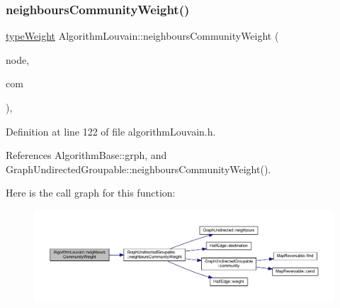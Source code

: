 \subsubsection{\texorpdfstring{neighbours\+Community\+Weight()}{neighboursCommunityWeight()}\hspace{0.1cm}{\footnotesize\ttfamily [1/2]}}
{\footnotesize\ttfamily \hyperlink{edge_8h_a2e7ea3be891ac8b52f749ec73fee6dd2}{type\+Weight} Algorithm\+Louvain\+::neighbours\+Community\+Weight (\begin{DoxyParamCaption}\item[{const \hyperlink{edge_8h_a5fbd20c46956d479cb10afc9855223f6}{type\+Vertex} \&}]{node,  }\item[{const \hyperlink{graphUndirectedGroupable_8h_a914da95c9ea7f14f4b7f875c36818556}{type\+Community} \&}]{com }\end{DoxyParamCaption})\hspace{0.3cm}{\ttfamily [inline]}, {\ttfamily [private]}}



Definition at line 122 of file algorithm\+Louvain.\+h.



References Algorithm\+Base\+::grph, and Graph\+Undirected\+Groupable\+::neighbours\+Community\+Weight().

Here is the call graph for this function\+:
\nopagebreak
\begin{figure}[H]
\begin{center}
\leavevmode
\includegraphics[width=350pt]{classAlgorithmLouvain_a4f1160234f469ddc9205e4d1217478ac_cgraph}
\end{center}
\end{figure}
\mbox{\label{classAlgorithmLouvain_afc30a152fabdd874d45a0728ada4ec6e}} 
